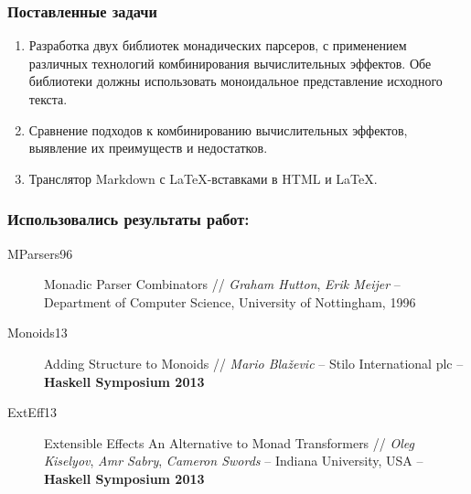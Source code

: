 \documentclass[12pt, compress, t]{beamer}
\begin{document}
\begin{frame}[fragile]
  \frametitle{Поставленные задачи}
  \begin{enumerate}
    \item Разработка двух библиотек монадических парсеров, с применением различных технологий комбинирования вычислительных эффектов. Обе библиотеки должны использовать моноидальное представление исходного текста.
    \item Сравнение подходов к комбинированию вычислительных эффектов, выявление их преимуществ и недостатков.
    \item Транслятор Markdown с \LaTeX-вставками в HTML и \LaTeX.
  \end{enumerate}
\end{frame}

\begin{frame}[fragile]
  \frametitle{Использовались результаты работ: }
  \begin{description}
    \item [MParsers96]
    Monadic Parser Combinators // \textit{Graham Hutton}, \textit{Erik Meijer} –
Department of Computer Science, University of Nottingham, 1996
    \item [Monoids13]
    Adding Structure to Monoids // \textit{Mario Blaževic} – Stilo International plc – \\\textbf{Haskell Symposium 2013}
    \item [ExtEff13] 
    Extensible Effects An Alternative to Monad Transformers // \textit{Oleg
Kiselyov}, \textit{Amr Sabry}, \textit{Cameron Swords} – Indiana University, USA – \textbf{Haskell Symposium 2013}
  \end{description}
\end{frame}
\end{document}
